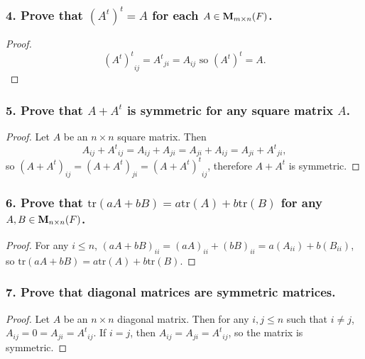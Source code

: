 \documentclass{article}
\begin{document}
\subsubsection*{4. Prove that $(A^t)^t = A$ for each $A \in \textbf{\textup{M}}_{m\times n}(F)$.}
\begin{proof}
	\[ {(A^t)^t}_{ij} = {A^t}_{ji} = A_{ij} \text { so } {(A^t)^t} = A. \]
\end{proof}

\subsubsection*{5. Prove that $A + A^t$ is symmetric for any square matrix $A$.}
\begin{proof}
	Let $A$ be an $n \times n$ square matrix. Then \[ A_{ij} + {A^t}_{ij} = A_{ij} + A_{ji} = A_{ji} + A_{ij} = A_{ji} + {A^t}_{ji}, \] so ${(A+A^t)_{ij} = (A+A^t)_{ji} = {(A+A^t)^t}_{ij}}$, therefore $A+A^t$ is symmetric.
\end{proof}

\subsubsection*{6. Prove that $\text{tr}(aA + bB) = a\text{tr}(A) + b\text{tr}(B)$ for any $A,B \in \textbf{\textup{M}}_{n \times n}(F)$.}
\begin{proof}
	For any $i \le n$, $(aA + bB)_{ii} = (aA)_{ii} + (bB)_{ii} = a(A_{ii}) + b(B_{ii})$, so $\text{tr}(aA + bB) = a\text{tr}(A) + b\text{tr}(B)$.
\end{proof}

\subsubsection*{7. Prove that diagonal matrices are symmetric matrices.}
\begin{proof}
	Let $A$ be an $n \times n$ diagonal matrix. Then for any $i, j \le n$ such that $i \ne j$, $A_{ij} = 0 = A_{ji} = {A^t}_{ij}$. If $i = j$, then $A_{ij} = A_{ji} = {A^t}_{ij}$, so the matrix is symmetric.
\end{proof}
\end{document}
